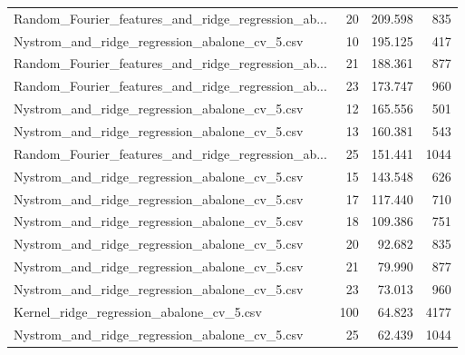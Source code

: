 \begin{tabularx}{\textwidth}{lrrr}
Random\_Fourier\_features\_and\_ridge\_regression\_ab... &       20 &  209.598 &           835 \\
     Nystrom\_and\_ridge\_regression\_abalone\_cv\_5.csv &       10 &  195.125 &           417 \\
Random\_Fourier\_features\_and\_ridge\_regression\_ab... &       21 &  188.361 &           877 \\
Random\_Fourier\_features\_and\_ridge\_regression\_ab... &       23 &  173.747 &           960 \\
     Nystrom\_and\_ridge\_regression\_abalone\_cv\_5.csv &       12 &  165.556 &           501 \\
     Nystrom\_and\_ridge\_regression\_abalone\_cv\_5.csv &       13 &  160.381 &           543 \\
Random\_Fourier\_features\_and\_ridge\_regression\_ab... &       25 &  151.441 &          1044 \\
     Nystrom\_and\_ridge\_regression\_abalone\_cv\_5.csv &       15 &  143.548 &           626 \\
     Nystrom\_and\_ridge\_regression\_abalone\_cv\_5.csv &       17 &  117.440 &           710 \\
     Nystrom\_and\_ridge\_regression\_abalone\_cv\_5.csv &       18 &  109.386 &           751 \\
     Nystrom\_and\_ridge\_regression\_abalone\_cv\_5.csv &       20 &   92.682 &           835 \\
     Nystrom\_and\_ridge\_regression\_abalone\_cv\_5.csv &       21 &   79.990 &           877 \\
     Nystrom\_and\_ridge\_regression\_abalone\_cv\_5.csv &       23 &   73.013 &           960 \\
          Kernel\_ridge\_regression\_abalone\_cv\_5.csv &      100 &   64.823 &          4177 \\
     Nystrom\_and\_ridge\_regression\_abalone\_cv\_5.csv &       25 &   62.439 &          1044 \\
\bottomrule
\end{tabularx}
